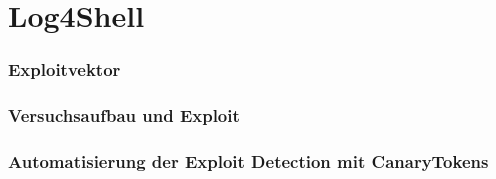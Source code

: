 
\clearpage
\section{Log4Shell}\label{sec:log4shell}



\clearpage
\subsubsection{Exploitvektor}

\subsubsection{Versuchsaufbau und Exploit}

\subsubsection{Automatisierung der Exploit Detection mit CanaryTokens}


